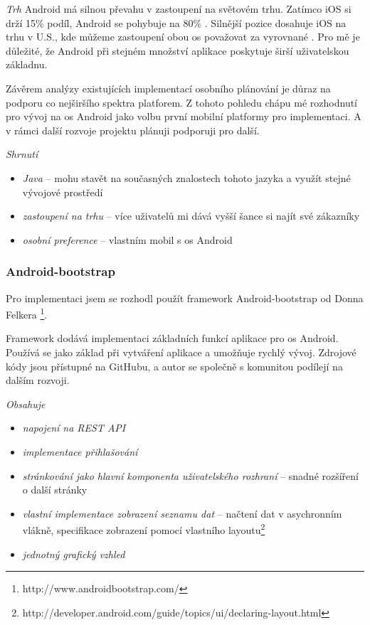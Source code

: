 \documentclass[thesis=B,czech]{FITthesis}[2012/06/26]
\begin{document}
\textit{Trh}
Android má silnou převahu v zastoupení na světovém trhu. Zatímco iOS si drží 15\% podíl, Android se pohybuje na 80\% \cite{android_market}. Silnější pozice dosahuje iOS na trhu v U.S., kde můžeme zastoupení obou \acrshort{os} považovat za vyrovnané \cite{android_market_us}. 
Pro mě je důležité, že Android při stejném množství aplikace poskytuje širší uživatelskou základnu. 

Závěrem analýzy existujících implementací osobního plánování je důraz na podporu co nejširšího spektra platforem. Z tohoto pohledu chápu mé rozhodnutí pro vývoj na \acrshort{os} Android jako volbu první mobilní platformy pro implementaci. A v rámci další rozvoje projektu plánuji podporuji pro další.\newline

\textit{Shrnutí}
\begin{itemize}[nosep]
	\item \textit{Java} -- mohu stavět na současných znalostech tohoto jazyka a využít stejné vývojové prostředí
	\item \textit{zastoupení na trhu} -- více uživatelů mi dává vyšší šance si najít své zákazníky
	\item \textit{osobní preference} -- vlastním mobil s \acrshort{os} Android
\end{itemize}

\subsubsection{Android-bootstrap}
\label{technologie:androdi:boostrap}
Pro implementaci jsem se rozhodl použít framework Android-bootstrap od Donna Felkera \footnote{http://www.androidbootstrap.com/}.

Framework dodává implementaci základních funkcí aplikace pro \acrshort{os} Android. Používá se jako základ při vytváření aplikace a umožňuje rychlý vývoj. Zdrojové kódy jsou přístupné na GitHubu, a autor se společně s komunitou podílejí na dalším rozvoji.\newline

\textit{Obsahuje}
\begin{itemize}[nosep]
	\item \textit{napojení na REST API}
	\item \textit{implementace přihlašování}  
	\item \textit{stránkování jako hlavní komponenta uživatelského rozhraní} -- snadné rozšíření o další stránky
	\item \textit{vlastní implementace zobrazení seznamu dat} -- načtení dat v asychronním vlákně, specifikace zobrazení pomocí vlastního layoutu\footnote{http://developer.android.com/guide/topics/ui/declaring-layout.html}  
	\item \textit{jednotný grafický vzhled}	
\end{itemize}
\end{document}
